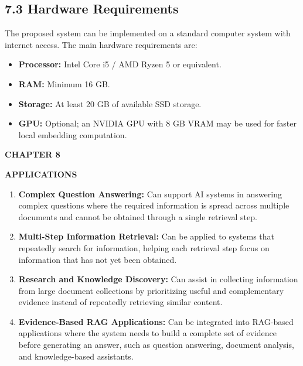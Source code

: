 \documentclass[12pt,a4paper]{report}
\newcommand{\chaptertitle}[2]{
    \begin{center}
        {\fontsize{18}{21}\selectfont\bfseries CHAPTER #1\par}
        \vspace{0.10in}
        {\fontsize{18}{21}\selectfont\bfseries #2\par}
    \end{center}
    \vspace{0.12in}
}
\begin{document}
\subsection*{7.3 Hardware Requirements}

The proposed system can be implemented on a standard computer system
with internet access. The main hardware requirements are:

\begin{itemize}[leftmargin=0.30in,itemsep=0.08in]
\item \textbf{Processor:} Intel Core i5 / AMD Ryzen 5 or equivalent.
\item \textbf{RAM:} Minimum 16 GB.
\item \textbf{Storage:} At least 20 GB of available SSD storage.
\item \textbf{GPU:} Optional; an NVIDIA GPU with 8 GB VRAM may be used
for faster local embedding computation.
\end{itemize}
\label{ch:7:end}

\clearpage

\chaptertitle{8}{APPLICATIONS}
\label{ch:8}

\begin{enumerate}[leftmargin=0.30in,itemsep=0.12in]

\item
\textbf{Complex Question Answering:} Can support AI systems in answering complex questions where the required information is spread across multiple documents and cannot be obtained through a single retrieval step.

\item
\textbf{Multi-Step Information Retrieval:} Can be applied to systems that repeatedly search for information, helping each retrieval step focus on information that has not yet been obtained.

\item
\textbf{Research and Knowledge Discovery:} Can assist in collecting information from large document collections by prioritizing useful and complementary evidence instead of repeatedly retrieving similar content.

\item
\textbf{Evidence-Based RAG Applications:} Can be integrated into RAG-based applications where the system needs to build a complete set of evidence before generating an answer, such as question answering, document analysis, and knowledge-based assistants.

\end{enumerate}
\clearpage
\end{document}
